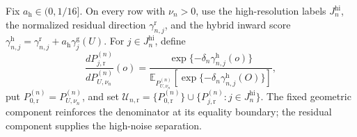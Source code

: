 Fix \(a_{\mathrm h}\in(0,1/16]\).  On every row with \(\nu_n>0\), use the high-resolution labels \(J_n^{\mathrm{hi}}\), the normalized residual direction \(\gamma_{n,j}^{\mathrm r}\), and the hybrid inward score \(\gamma_{n,j}^{\mathrm h}=\gamma_{n,j}^{\mathrm r}+a_{\mathrm h}\gamma_j^{\mathrm g}(U)\).  For \(j\in J_n^{\mathrm{hi}}\), define
\[
 \frac{dP_{j,\mathrm r}^{(n)}}{dP_{U,\nu_n}^{(n)}}(o)
 =\frac{\exp\{-\delta_n\gamma_{n,j}^{\mathrm h}(o)\}}
 {\mathbb E_{P_{U,\nu_n}^{(n)}}[\exp\{-\delta_n\gamma_{n,j}^{\mathrm h}(O)\}]},
\]
put \(P_{0,\mathrm r}^{(n)}=P_{U,\nu_n}^{(n)}\), and set \(\mathcal U_{n,\mathrm r}=\{P_{0,\mathrm r}^{(n)}\}\cup\{P_{j,\mathrm r}^{(n)}:j\in J_n^{\mathrm{hi}}\}\).  The fixed geometric component reinforces the denominator at its equality boundary; the residual component supplies the high-noise separation.